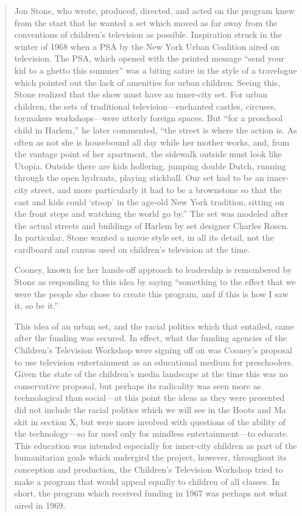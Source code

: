 \documentclass[12pt,letterpaper]{article}
\begin{document}
\begin{quote}
	Jon Stone, who wrote, produced, directed, and acted on the program knew
	from the start that he wanted a set which moved as far away from the 	
	conventions of children's television as possible.  
	Inspiration struck in the winter of 1968 when a PSA by the New York 
	Urban Coalition aired on television. The PSA, which opened with the
	printed message ``send your kid to a ghetto this summer''  was a biting
	satire in the style of a travelogue which pointed out the lack of 
	amenities for urban children. Seeing this, Stone realized that the show
	must have an inner-city set. For urban children, the sets of traditional
	television---enchanted castles, circuses, toymakers workshops---were
	utterly foreign spaces. But ``for a preschool child
	in Harlem,'' he later commented, ``the street is where the action is. As
	often as not she is housebound all day while her mother works, and, from	
	the vantage point of her apartment, the sidewalk outside must look like
	Utopia. Outside there are kids hollering, jumping double Dutch, running
	through the open hydrants, playing stickball. Our set had to be an 
	inner-city street, and more particularly it had to be a brownstone so 
	that the cast and kids could `stoop' in the age-old New York tradition,
	sitting on the front steps and watching the world go by.'' The set was 
	modeled after the actual streets and buildings of Harlem by set designer
	Charles Rosen. In particular, Stone wanted a movie style set, in all its
	detail, not the cardboard and canvas used on children's television at 
	the time.\autocite[154]{Davis}

	Cooney, known for her hands-off approach to leadership is remembered by
	Stone as responding to this idea by saying ``something to the effect 
	that we were the people she chose to create this program, and if this is
	how I saw it, so be it.'' \autocite[155]{Davis} 

	This idea of an urban set, and the racial politics which that 
	entailed, came after the funding was secured. In effect, what the 
	funding agencies of the Children’s Television Workshop were signing off
	on was Cooney’s proposal to use television entertainment as an 
	educational medium for preschoolers. Given the state of the children’s 
	media landscape at the time \autocite[chapters 1, 3, and 4]{Davis} this 
	was no conservative proposal, but perhaps its radicality was seen more 
	as technological than social---at this point the ideas as they were 
	presented did not include the racial politics which we will see in 
	the Hoots and Ma skit in section X, but were more involved with 
	questions of the ability of the technology---so far used only for 
	mindless entertainment---to educate. This education was intended 
	especially for inner-city children as part of the humanitarian goals 
	which undergird the project, however, throughout its conception and 
	production, the Children's Television Workshop tried to make a program 
	that would appeal equally to children of all classes. In short, the 
	program which received funding in 1967 was perhaps not what aired in 
	1969.


\end{quote}
\end{document}
